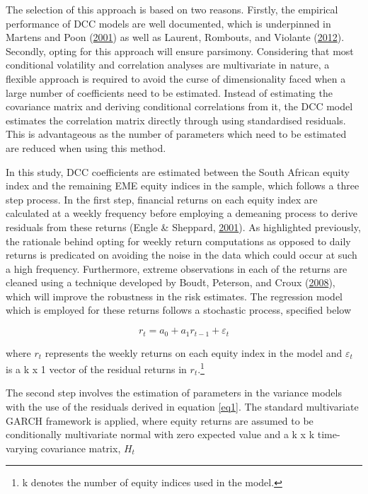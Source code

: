 \documentclass[11pt,preprint, authoryear]{elsarticle}
\numberwithin{equation}{section}
\numberwithin{figure}{section}
\numberwithin{table}{section}
\let\rmarkdownfootnote\footnote%
\def\footnote{\protect\rmarkdownfootnote}
\begin{document}
The selection of this approach is based on two reasons. Firstly, the
empirical performance of DCC models are well documented, which is
underpinned in Martens and Poon
(\protect\hyperlink{ref-martens2001returns}{2001}) as well as Laurent,
Rombouts, and Violante
(\protect\hyperlink{ref-laurent2012forecasting}{2012}). Secondly, opting
for this approach will ensure parsimony. Considering that most
conditional volatility and correlation analyses are multivariate in
nature, a flexible approach is required to avoid the curse of
dimensionality faced when a large number of coefficients need to be
estimated. Instead of estimating the covariance matrix and deriving
conditional correlations from it, the DCC model estimates the
correlation matrix directly through using standardised residuals. This
is advantageous as the number of parameters which need to be estimated
are reduced when using this method.

In this study, DCC coefficients are estimated between the South African
equity index and the remaining EME equity indices in the sample, which
follows a three step process. In the first step, financial returns on
each equity index are calculated at a weekly frequency before employing
a demeaning process to derive residuals from these returns (Engle
\& Sheppard, \protect\hyperlink{ref-engle2001theoretical}{2001}). As
highlighted previously, the rationale behind opting for weekly return
computations as opposed to daily returns is predicated on avoiding the
noise in the data which could occur at such a high frequency.
Furthermore, extreme observations in each of the returns are cleaned
using a technique developed by Boudt, Peterson, and Croux
(\protect\hyperlink{ref-boudt2008estimation}{2008}), which will improve
the robustness in the risk estimates. The regression model which is
employed for these returns follows a stochastic process, specified below

\begin{equation}
r_t = a_0 + {a_1}{r_{t-1}} + \varepsilon_t
\label{eq1}
\end{equation}

where \(r_t\) represents the weekly returns on each equity index in the
model and \(\varepsilon_t\) is a k x 1 vector of the residual returns in
\(r_t\).\footnote{k denotes the number of equity indices used in the
  model.}

The second step involves the estimation of parameters in the variance
models with the use of the residuals derived in equation \ref{eq1}. The
standard multivariate GARCH framework is applied, where equity returns
are assumed to be conditionally multivariate normal with zero expected
value and a k x k time-varying covariance matrix, \(H_t\)
\end{document}

